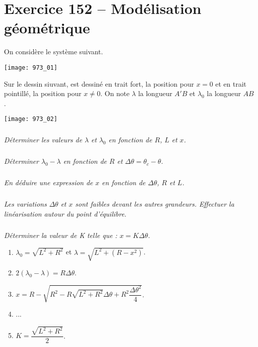 \section*{Exercice 152 -- Modélisation géométrique}
\setcounter{exo}{0}

On considère le système suivant. 
\begin{center}
\texttt{[image: 973\_01]}%
\end{center}


Sur le dessin siuvant, est dessiné en trait fort, la position pour $x=0$ et en trait pointillé, la position pour $x\neq0$. On note $\lambda$ la longueur $A'B$ et $\lambda_0$ la longueur $AB$. 

\begin{center}
\texttt{[image: 973\_02]}%
\end{center}


\subparagraph{}
\textit{Déterminer les valeurs de $\lambda$ et $\lambda_0$ en fonction de $R$, $L$ et $x$.}
\ifprof
\begin{corrige}
\end{corrige}
\else
\fi


\subparagraph{}
\textit{Déterminer $\lambda_0 - \lambda$ en fonction de $R$ et $\Delta \theta = \theta_c - \theta$.}
\ifprof
\begin{corrige}
\end{corrige}
\else
\fi


\subparagraph{}
\textit{En déduire une expression de $x$ en fonction de $\Delta \theta$, $R$ et $L$.}
\ifprof
\begin{corrige}
\end{corrige}
\else
\fi


\subparagraph{}
\textit{Les variations $\Delta \theta$ et $x$ sont faibles devant les autres grandeurs. Effectuer la linéarisation autour du point d’équilibre.}
\ifprof
\begin{corrige}
\end{corrige}
\else
\fi


\subparagraph{}
\textit{Déterminer la valeur de K telle que : $x=K\Delta \theta$.}
\ifprof
\begin{corrige}
\end{corrige}
\else
\fi


\begin{enumerate}
\item $\lambda_0 = \sqrt{L^2+R^2}$ et $\lambda = \sqrt{L^2 +\left(R-x^2\right)}$.
\item $2\left(\lambda_0 -\lambda\right)=R\Delta \theta$.
\item $x=R-\sqrt{R^2-R\sqrt{L^2+R^2}\Delta \theta+R^2\dfrac{\Delta \theta^2}{4}}$.
\item ...
\item $K=\dfrac{\sqrt{L^2+R^2}}{2}$.
\end{enumerate}